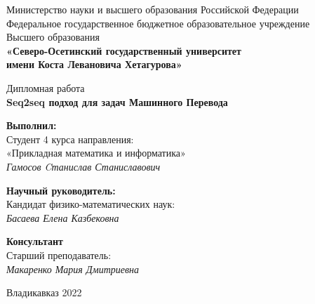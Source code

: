 \setcounter{page}{0}

\begin{center}
	\small{Министерство науки и высшего образования Российской Федерации}\\
	\small{Федеральное государственное бюджетное образовательное учреждение}\\
	\small{Высшего образования}\\
	\small{\textbf{«Северо-Осетинский государственный университет\\
			имени Коста Левановича Хетагурова»}}\\
	
	\hfill \break
	\hfill \break
	\hfill \break
	\hfill \break
	\hfill \break
	\hfill \break
	\hfill \break
	\hfill \break
	\hfill \break
	\hfill \break
	\hfill \break
	\hfill \break
	\hfill \break
	
	\normalsize{Дипломная работа}\\
	\large{\textbf{Seq2seq подход для задач Машинного Перевода}}\\
	
	\hfill \break
	\hfill \break
	\hfill \break
	\hfill \break
	\hfill \break
	\hfill\break
\end{center}

\begin{flushright}
	\textbf{Выполнил:}\\
	Студент 4 курса направления:\\
	«Прикладная математика и информатика»\\
	\textit{Гамосов Cтанислав Станиславович \underline{\hspace{3cm}}}\\
\end{flushright}

\hfill

\begin{flushright}
	\textbf{Научный руководитель:}\\
	Кандидат физико-математических наук:\\
	\textit{Басаева Елена Казбековна \underline{\hspace{3cm}}}\\
\end{flushright}

\hfill

\begin{flushright}
	\textbf{Консультант}\\
	Старший преподаватель: \\
	\textit{Макаренко Мария Дмитриевна \underline{\hspace{3cm}}}\\
\end{flushright}

\normalsize{ \hspace{28pt}} \hfill \break
\begin{center} Владикавказ 2022 \end{center}
\thispagestyle{empty}
\clearpage